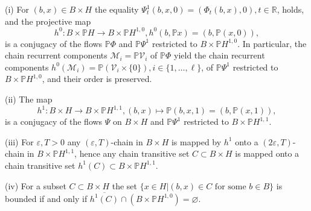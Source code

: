 	\begin{proposition}
		\label{Proposition_e}(i) For $(b,x)\in B\times H$ the equality $\Psi_{t}
		^{1}(b,x,0)=(\Phi_{t}(b,x),0),\allowbreak t\in\mathbb{R}$, holds, and the
		projective map
		\[
		h^{0}:B\times\mathbb{P}H\rightarrow B\times\mathbb{P}H^{1,0},h^{0}
		(b,\mathbb{P}x)=(b,\mathbb{P}(x,0)),
		\]
		is a conjugacy of the flows $\mathbb{P}\Phi$ and $\mathbb{P}\Psi^{1}$
		restricted to $B\times\mathbb{P}H^{1,0}$. In particular, the chain recurrent
		components $\mathcal{M}_{i}=\mathbb{P}\mathcal{V}_{i}$ of $\mathbb{P}\Phi$
		yield the chain recurrent components $h^{0}(\mathcal{M}_{i})=\mathbb{P}\left(
		\mathcal{V}_{i}\times\{0\}\right)  ,i\in\{1,\ldots,\ell\}$, of $\mathbb{P}
		\Psi^{1}$ restricted to $B\times\mathbb{P}H^{1,0}$, and their order is preserved.
		
		(ii) The map
		\[
		h^{1}:B\times H\rightarrow B\times\mathbb{P}H^{1,1},(b,x)\mapsto
		\mathbb{P}(b,x,1)=(b,\mathbb{P}(x,1)),
		\]
		is a conjugacy of the flows $\Psi$ on $B\times H$ and $\mathbb{P}\Psi^{1}$
		restricted to $B\times\mathbb{P}H^{1,1}$.
		
		(iii) For $\varepsilon,T>0$ any $(\varepsilon,T)$-chain in $B\times H$ is
		mapped by $h^{1}$ onto a $(2\varepsilon,T)$-chain in $B\times\mathbb{P}%
		H^{1,1}$, hence any chain transitive set $C\subset B\times H$ is mapped onto a
		chain transitive set $h^{1}(C)\subset B\times\mathbb{P}H^{1,1}$.
		
		(iv) For a subset $C\subset B\times H$ the set $\{x\in H\left\vert (b,x)\in
		C\mbox{ for some }b\in B\right.  \}$ is bounded if and only if $\overline
		{h^{1}(C)}\cap(B\times\mathbb{P}H^{1,0})=\varnothing$.
	\end{proposition}
	
